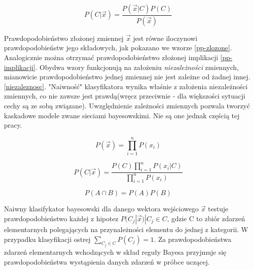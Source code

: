 \documentclass[12pt,a4paper,oneside]{report} %
\begin{document}
\begin{equation}
P(C|\vec{x}) = \frac{P(\vec{x}|C)P(C)}{P(\vec{x})}
\end{equation}

Prawdopodobieństwo złożonej zmiennej $\vec{x}$ jest równe iloczynowi prawdopodobieństw jego składowych, jak pokazano we wzorze \ref{pp-zlozone}. Analogicznie można otrzymać prawdopodobieństwo złożonej implikacji \ref{pp-implikacji}. Obydwa wzory funkcjonują na założeniu \emph{niezależności} zmiennych, mianowicie prawdopodobieństwo jednej zmiennej nie jest zależne od żadnej innej. \ref{niezaleznosc}. "Naiwność" klasyfikatora wynika właśnie z założenia niezależności zmiennych, co nie zawsze jest prawdą(wręcz przeciwnie - dla większości sytuacji cechy są ze sobą związane). Uwzględnienie zależności zmiennych pozwala tworzyć kaskadowe modele zwane sieciami bayesowskimi. \cite{dm-cichosz} Nie są one jednak częścią tej pracy.\par

\begin{equation}
P(\vec{x}) = \prod\limits_{i=1}^n{P(x_i)}
\end{equation}
\label{pp-zlozone}

\begin{equation}
P(C|\vec{x}) = \frac{P(C)\prod\limits_{i=1}^n{P(x_i|C)}}{\prod\limits_{i=1}^n{P({x_i})}}
\end{equation}
\label{pp-implikacji}

\begin{equation}
P(A \cap B) = P(A)P(B)
\end{equation}
\label{niezaleznosc}

Naiwny klasifykator bayesowski dla danego wektora wejściowego $\vec{x}$ testuje prawdopodobieństwo każdej z hipotez $P(C_j|\vec{x}) | C_j \in C$, gdzie C to zbiór zdarzeń elementarnych polegających na przynależności elementu do jednej z kategorii. W przypadku klasyfikacji ostrej $\sum\limits_{C_j \in C} P(C_j) = 1 $. Za prawdopodobieństwa zdarzeń elementarnych wchodzących w skład reguły Bayesa przyjmuje się prawdopodobieństwa wystąpienia danych zdarzeń w próbce uczącej. \par
\end{document}
